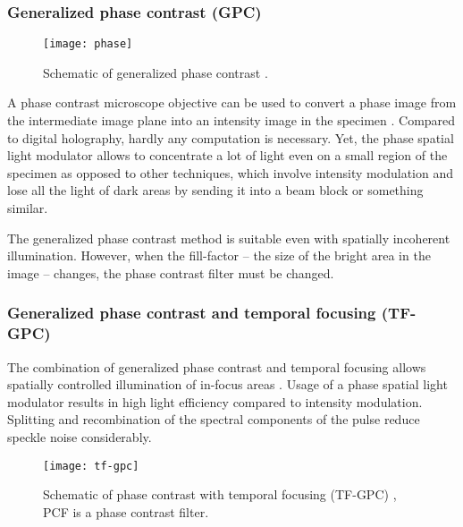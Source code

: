 \subsubsection{Generalized phase contrast (GPC)}
\begin{figure}[!hbt]
  \centering
  \texttt{[image: phase]} %
  \caption{Schematic of generalized phase contrast
    \citep[from][]{Rodrigo2008}.}
  \label{fig:phase}
\end{figure}
A phase contrast microscope objective  can be used to
convert a phase image from the intermediate image plane into an
intensity image in the specimen \citep{Rodrigo2008}. Compared to digital holography, hardly any computation is
necessary. Yet, the phase spatial light modulator allows to
concentrate a lot of light even on a small region of the specimen as
opposed to other techniques, which involve intensity modulation and
lose all the light of dark areas by sending it into a beam block or
something similar.

The generalized phase contrast method is suitable even with spatially
incoherent illumination. However, when the
fill-factor -- the size of the bright area in the image -- changes,
the phase contrast filter must be changed.
\subsubsection{Generalized phase contrast and temporal focusing (TF-GPC)}
The combination of generalized phase contrast and temporal focusing
allows spatially controlled illumination of in-focus areas
\citep{Papagiakoumou2010}. Usage of a phase spatial light modulator
results in high light efficiency compared to intensity modulation.
Splitting and recombination of the spectral components of the pulse
reduce speckle noise considerably.
\begin{figure}[!hbt]
  \centering
  \texttt{[image: tf-gpc]} 
  \caption{Schematic of phase contrast with temporal focusing (TF-GPC)
    \citep[from][]{Papagiakoumou2010}, PCF is a phase contrast filter.}
  \label{fig:tf-gpc}
\end{figure}

